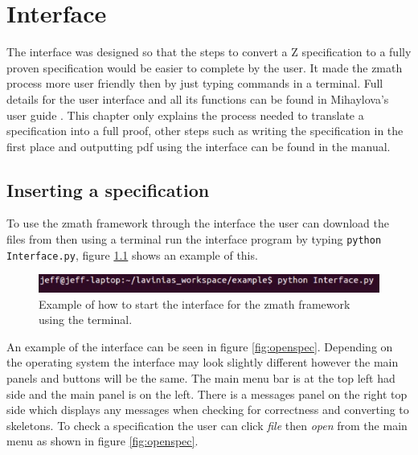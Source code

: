 \chapter{Interface}
\label{ch:interface}

The interface was designed so that the steps to convert a Z specification to a
fully proven specification would be easier to complete by the user. It made the
\gls{zmath} process more user friendly then by just typing commands in a
terminal. Full details for the user interface and all its functions can be found
in Mihaylova's user guide \cite{zmathuser}. This chapter only explains the process
needed to translate a specification into a full proof, other steps such as
writing the specification in the first place and outputting pdf using the
interface can be found in the manual.

\section{Inserting a specification}
To use the \gls{zmath} framework through the interface the user can download the
files from \cite{zmathweb} then using a terminal run the interface program by
typing \newline \verb|python Interface.py|, figure \ref{fig:startinterface}
shows an example of this.

\begin{figure}[H]
    \centering
\includegraphics[scale=0.8]{Figures/Interface/startinterface.png}
\caption{Example of how to start the interface for the \gls{zmath} framework using the terminal. \label{fig:startinterface}}
\end{figure}

An example of the interface can be seen in figure \ref{fig:openspec}. Depending
on the operating system the interface may look slightly different however the
main panels and buttons will be the same. The main menu bar is at the top left
had side and the main panel is on the left. There is a messages panel on the
right top side which displays any messages when checking for correctness and
converting to skeletons. To check a specification the user can click \emph{file}
then \emph{open} from the main menu as shown in figure \ref{fig:openspec}.

